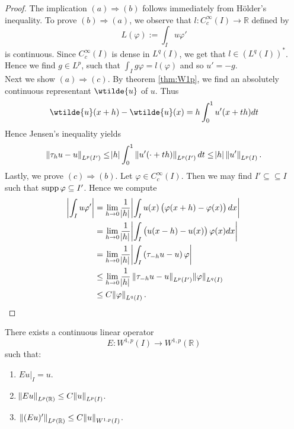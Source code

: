 \begin{proof}
	The implication $(a)\Rightarrow(b)$ follows immediately from H\"older's inequality. To prove $(b)\Rightarrow(a)$, we observe that $l : C^\infty_c(I) \to \mathbb{R}$ defined by
	\begin{equation*}
		L(\varphi) := \int_I u \varphi'
	\end{equation*}
	\noindent is continuous. Since $C^\infty_c(I)$ is dense in $L^q(I)$, we get that $l \in (L^q(I))^*$. Hence we find $g \in L^p$, such that $\int_I g\varphi = l(\varphi)$ and so $u' = -g$.\\
	Next we show $(a)\Rightarrow(c)$. By theorem \ref{thm:W1p}, we find an absolutely continuous representant $\wtilde{u}$ of $u$. Thus
	\begin{equation*}
		\wtilde{u}(x + h) - \wtilde{u}(x) = h\int_0^1 u'(x + th) dt
	\end{equation*}
	Hence Jensen's inequality yields
	\begin{equation*}
		\norm[0]{\tau_hu - u}_{L^p(I')} \leq \abs{h} \int_0^1 \norm[0]{u'(\cdot + th)}_{L^p(I')}dt \leq \abs{h} \norm[0]{u'}_{L^p(I)}.
	\end{equation*}
	Lastly, we prove $(c)\Rightarrow(b)$. Let $\varphi \in C^\infty_c(I)$. Then we may find $I' \subseteq \subseteq I$ such that $\operatorname{supp} \varphi\subseteq I'$. Hence we compute
	\begin{align*}
		\abs[3]{\int_I u\varphi'} &= \lim_{h \to 0}\frac{1}{\abs{h}} \abs[3]{\int_I u(x) \del[1]{\varphi(x + h) - \varphi(x)} dx}\\
		&= \lim_{h \to 0}\frac{1}{\abs{h}} \abs[3]{\int_I \del[1]{u(x - h) - u(x)} \varphi(x)dx}\\
		&= \lim_{h \to 0}\frac{1}{\abs{h}} \abs[3]{\int_I \del[0]{\tau_{-h}u - u}\varphi}\\
		&\leq \lim_{h \to 0}\frac{1}{\abs{h}}\norm[0]{\tau_{-h}u - u}_{L^p(I')}\norm{\varphi}_{L^q(I)}\\
		&\leq C\norm{\varphi}_{L^q(I)}.
	\end{align*}
\end{proof}

\begin{theorem}
	\label{thm:extension}
	There exists a continuous linear operator 
	\begin{equation*}
		E : W^{1,p}(I) \to W^{1,p}(\mathbb{R})
	\end{equation*}
	\noindent such that:
	\begin{enumerate}[label = \textup{(}\roman*\textup{)},wide = 0pt]
		\item $Eu\vert_I = u$.
		\item $\norm{Eu}_{L^p(\mathbb{R})} \leq C \norm{u}_{L^p(I)}$.
		\item $\norm[0]{(Eu)'}_{L^p(\mathbb{R})} \leq C\norm{u}_{W^{1,p}(I)}$.
	\end{enumerate}
\end{theorem}

